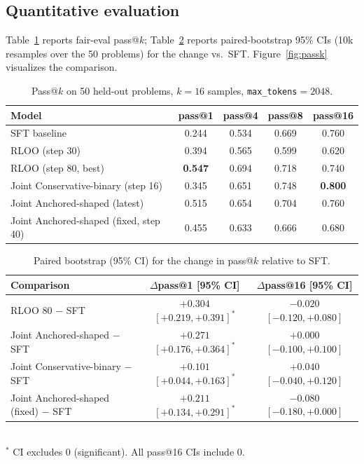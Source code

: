\documentclass{article}
\begin{document}
\subsection{Quantitative evaluation}
Table~\ref{tab:passk} reports fair-eval pass@$k$; Table~\ref{tab:ci} reports
paired-bootstrap 95\% CIs (10k resamples over the 50 problems) for the change vs.\
SFT. Figure~\ref{fig:passk} visualizes the comparison.

\begin{table}[h]
\centering\small
\caption{Pass@$k$ on 50 held-out problems, $k{=}16$ samples,
\texttt{max\_tokens}${=}2048$.}
\label{tab:passk}
\begin{tabular}{lcccc}
\toprule
Model & pass@1 & pass@4 & pass@8 & pass@16 \\
\midrule
SFT baseline        & 0.244 & 0.534 & 0.669 & 0.760 \\
RLOO (step 30)      & 0.394 & 0.565 & 0.599 & 0.620 \\
RLOO (step 80, best)& \textbf{0.547} & 0.694 & 0.718 & 0.740 \\
Joint Conservative-binary (step 16)  & 0.345 & 0.651 & 0.748 & \textbf{0.800} \\
Joint Anchored-shaped (latest)   & 0.515 & 0.654 & 0.704 & 0.760 \\
Joint Anchored-shaped (fixed, step 40) & 0.455 & 0.633 & 0.666 & 0.680 \\
\bottomrule
\end{tabular}
\end{table}

\begin{table}[h]
\centering\small
\caption{Paired bootstrap (95\% CI) for the change in pass@$k$ relative to SFT.}
\label{tab:ci}
\begin{tabular}{lcc}
\toprule
Comparison & $\Delta$pass@1 [95\% CI] & $\Delta$pass@16 [95\% CI] \\
\midrule
RLOO 80 $-$ SFT & $+0.304$ $[+0.219,+0.391]^{*}$ & $-0.020$ $[-0.120,+0.080]$ \\
Joint Anchored-shaped $-$ SFT & $+0.271$ $[+0.176,+0.364]^{*}$ & $+0.000$ $[-0.100,+0.100]$ \\
Joint Conservative-binary $-$ SFT & $+0.101$ $[+0.044,+0.163]^{*}$ & $+0.040$ $[-0.040,+0.120]$ \\
Joint Anchored-shaped (fixed) $-$ SFT & $+0.211$ $[+0.134,+0.291]^{*}$ & $-0.080$ $[-0.180,+0.000]$ \\
\bottomrule
\end{tabular}\\[2pt]
\footnotesize $^{*}$ CI excludes 0 (significant). All pass@16 CIs include 0.
\end{table}
\end{document}
